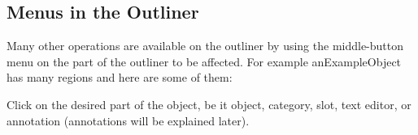 \documentclass[letterpaper,10pt,english]{sphinxmanual}
\begin{document}
\subsection{Menus in the Outliner}
\label{howtoprg:menus-in-the-outliner}
Many other operations are available on the outliner by using the middle-button menu on the part of
the outliner to be affected. For example anExampleObject has many regions and here are some
of them:
\begin{figure}[htbp]\begin{flushleft}

\end{flushleft}\end{figure}

Click on the desired part of the object, be it object, category, slot, text editor, or annotation (annotations
will be explained later).
\end{document}
